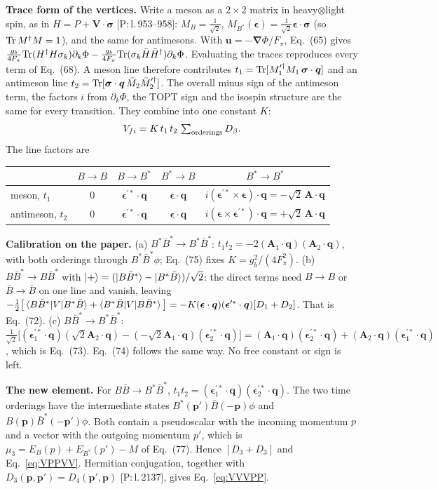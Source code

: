 \documentclass[11pt,a4paper]{article}
\newcommand{\tagP}[1]{\textcolor{blue!65!black}{\textsf{\small[P:\,#1]}}}
\newcommand{\tagD}{\textcolor{orange!85!black}{\textsf{\small[D]}}}
\newcommand{\BB}{B\bar B}
\newcommand{\BBst}{B\bar B^*}
\newcommand{\BstBst}{B^*\bar B^*}
\newcommand{\vq}{\bm q}
\newcommand{\veps}{\bm\epsilon}
\newcommand{\vA}{\bm A}
\begin{document}
\begin{derbox}[Derivation \tagD]
\textbf{Trace form of the vertices.} Write a meson as a $2\times2$ matrix in heavy$\otimes$light spin, as in $H=P+\bm V\cdot\bm\sigma$ \tagP{l.\,953--958}: $M_B=\frac{1}{\sqrt2}$, $M_{B^*}(\veps)=\frac{1}{\sqrt2}\veps\cdot\bm\sigma$ (so ${\rm Tr}\,M^\dagger M=1$), and the same for antimesons. With $\bm u=-\bm\nabla\Phi/F_\pi$, Eq.~(65) gives $\frac{g_b}{4F_\pi}{\rm Tr}(H^\dagger H\sigma_k)\partial_k\Phi-\frac{g_b}{4F_\pi}{\rm Tr}(\sigma_k\bar H\bar H^\dagger)\partial_k\Phi$. Evaluating the traces reproduces every term of Eq.~(68). A meson line therefore contributes $t_1={\rm Tr}[M_1^{\prime\dagger}M_1\,\bm\sigma\cdot\vq]$ and an antimeson line $t_2={\rm Tr}[\bm\sigma\cdot\vq\,\bar M_2\bar M_2^{\prime\dagger}]$. The overall minus sign of the antimeson term, the factors $i$ from $\partial_k\Phi$, the TOPT sign and the isospin structure are the same for every transition. They combine into one constant $K$:
\[
V_{fi}=K\,t_1\,t_2\,\textstyle\sum_{\rm orderings}D_\beta .
\]
The line factors are
\begin{center}
\small
\begin{tabular}{lcccc}
\toprule
& $B\to B$ & $B\to B^*$ & $B^*\to B$ & $B^*\to B^*$\\
\midrule
meson, $t_1$ & 0 & $\veps^{\prime*}\cdot\vq$ & $\veps\cdot\vq$ & $i(\veps^{\prime*}\times\veps)\cdot\vq=-\sqrt2\,\vA\cdot\vq$\\
antimeson, $t_2$ & 0 & $\veps^{\prime*}\cdot\vq$ & $\veps\cdot\vq$ & $i(\veps\times\veps^{\prime*})\cdot\vq=+\sqrt2\,\vA\cdot\vq$\\
\bottomrule
\end{tabular}
\end{center}
\textbf{Calibration on the paper.} (a) $\BstBst\to\BstBst$: $t_1t_2=-2(\vA_1\cdot\vq)(\vA_2\cdot\vq)$, with both orderings through $\BstBst\phi$; Eq.~(75) fixes $K=g_b^2/(4F_\pi^2)$. (b) $\BBst\to\BBst$ with $\ket{+}=(\ket{\BBst}-\ket{B^*\bar B})/\sqrt2$: the direct terms need $B\to B$ or $\bar B\to\bar B$ on one line and vanish, leaving $-\frac12\big[\braket{\BBst|V|B^*\bar B}+\braket{B^*\bar B|V|\BBst}\big]=-K(\veps\cdot\vq)(\veps^{\prime*}\cdot\vq)[D_1+D_2]$. That is Eq.~(72). (c) $\BBst\to\BstBst$: $\frac{1}{\sqrt2}\big[(\veps_1^{\prime*}\cdot\vq)(\sqrt2\vA_2\cdot\vq)-(-\sqrt2\vA_1\cdot\vq)(\veps_2^{\prime*}\cdot\vq)\big]=(\vA_1\cdot\vq)(\veps_2^{\prime*}\cdot\vq)+(\vA_2\cdot\vq)(\veps_1^{\prime*}\cdot\vq)$, which is Eq.~(73). Eq.~(74) follows the same way. No free constant or sign is left.

\textbf{The new element.} For $\BB\to\BstBst$, $t_1t_2=(\veps_1^{\prime*}\cdot\vq)(\veps_2^{\prime*}\cdot\vq)$. The two time orderings have the intermediate states $B^*(\bm p')\bar B(-\bm p)\phi$ and $B(\bm p)\bar B^*(-\bm p')\phi$. Both contain a pseudoscalar with the incoming momentum $p$ and a vector with the outgoing momentum $p'$, which is $\mu_3=E_B(p)+E_{B^*}(p')-M$ of Eq.~(77). Hence $[D_3+D_3]$ and Eq.~\eqref{eq:VPPVV}. Hermitian conjugation, together with $D_3(\bm p,\bm p')=D_4(\bm p',\bm p)$ \tagP{l.\,2137}, gives Eq.~\eqref{eq:VVVPP}.
\end{derbox}
\end{document}
